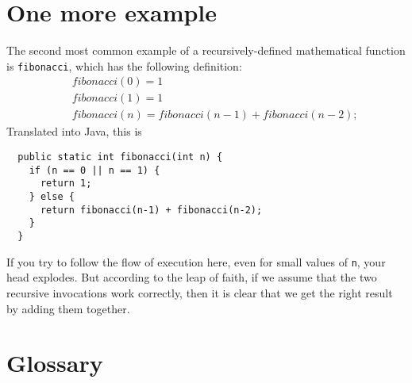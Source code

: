 \documentclass[12pt]{book}
\theoremstyle{definition}
\begin{document}
\section{One more example}
\label{fibonacci}

The second most common example of a recursively-defined
mathematical function is {\tt fibonacci}, which has the
following definition:
%
\begin{eqnarray*}
&& fibonacci(0) = 1 \\
&& fibonacci(1) = 1 \\
&& fibonacci(n) = fibonacci(n-1) + fibonacci(n-2);
\end{eqnarray*}
%
Translated into Java, this is

\begin{lstlisting}
  public static int fibonacci(int n) {
    if (n == 0 || n == 1) {
      return 1;
    } else {
      return fibonacci(n-1) + fibonacci(n-2);
    }
  }
\end{lstlisting}
%
If you try to follow the flow of execution here, even for small
values of {\tt n}, your head explodes.  But according to the leap of
faith, if we assume that the two recursive invocations work correctly, then
it is clear that we get the right result by adding them together.


\section{Glossary}
\end{document}
